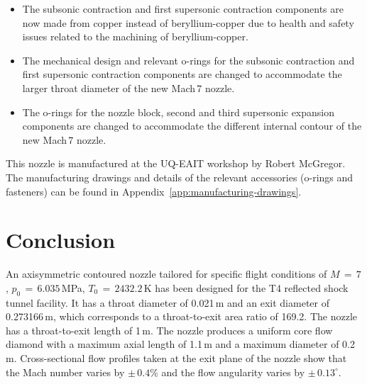 \documentclass[12pt,a4paper]{article}
\begin{document}
\begin{itemize}
 \item The subsonic contraction and first supersonic contraction components are 
       now made from copper instead of beryllium-copper due to health and safety 
       issues related to the machining of beryllium-copper.
 \item The mechanical design and relevant o-rings for the subsonic contraction 
       and first supersonic contraction components are changed to accommodate the 
       larger throat diameter of the new Mach\,7 nozzle.
 \item The o-rings for the nozzle block, second and third supersonic expansion 
       components are changed to accommodate the different internal contour of 
       the new Mach\,7 nozzle.
\end{itemize}

This nozzle is manufactured at the UQ-EAIT workshop by Robert McGregor. The 
manufacturing drawings and details of the relevant accessories (o-rings and 
fasteners) can be found in Appendix~\ref{app:manufacturing-drawings}.


\section{Conclusion}
\label{sec:conclusion}
%
An axisymmetric contoured nozzle tailored for specific flight conditions
of $M\,=\,7$, $p_0\,=\,6.035$\,MPa, $T_0\,=\,2432.2$\,K has been designed 
for the T4 reflected shock tunnel facility. It has a throat diameter of 
0.021\,m and an exit diameter of 0.273166\,m, which corresponds to a 
throat-to-exit area ratio of 169.2. The nozzle has a throat-to-exit length 
of 1\,m. The nozzle produces a uniform core flow diamond with a maximum 
axial length of 1.1\,m and a maximum diameter of 0.2\,m. Cross-sectional 
flow profiles taken at the exit plane of the nozzle show that the Mach number
varies by $\pm\,0.4$\% and the flow angularity varies by $\pm\,0.13^{\circ}$.


\newpage


\newpage


\appendix

\newpage
\end{document}
